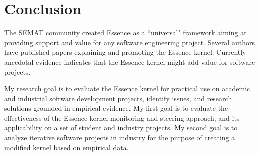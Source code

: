 \documentclass[preprint,12pt,3p]{elsarticle}
\begin{document}


\section{Conclusion}
\label{Conclusions}

The SEMAT community created Essence as a ``universal" framework aiming at providing support and value for any software engineering project. Several authors have published papers explaining and promoting the Essence kernel. Currently anecdotal evidence indicates that the Essence kernel might add value for software projects. 

My research goal is to evaluate the Essence kernel for practical use on academic and industrial software development projects, identify issues, and research solutions grounded in empirical evidence. My first goal is to evaluate the effectiveness of the Essence kernel monitoring and steering approach, and its applicability on a set of student and industry projects. My second goal is to analyze iterative software projects in industry for the purpose of creating a modified kernel based on empirical data.
\end{document}
